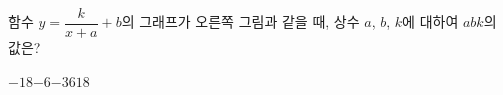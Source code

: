 \hspace*{2mm}\begin{minipage}[t]{\dimexpr\linewidth-2mm\relax}\vspace{0pt}
\noindent\begin{minipage}[t]{0.58\linewidth}\vspace{0pt}\raggedright 함수 $y=\dfrac{k}{x+a}+b$의 그래프가 오른쪽 그림과 같을 때, 상수 $a$, $b$, $k$에 대하여 $abk$의 값은?\end{minipage}\hfill\begin{minipage}[t]{0.4\linewidth}\vspace{0pt}\centering \resizebox{\ifdim\width>\linewidth\linewidth\else\width\fi}{!}{}\end{minipage}\par
\begin{choicesii}{$-18$}{$-6$}{$-3$}{$6$}{$18$}\end{choicesii}\end{minipage}
